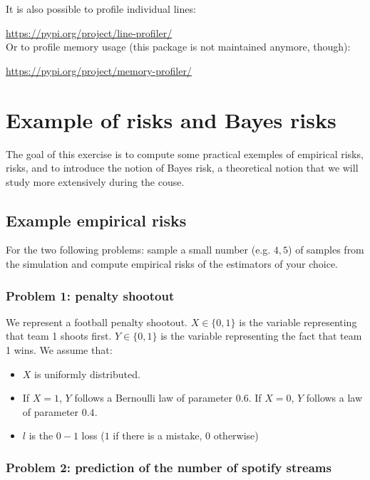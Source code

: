 \documentclass[
10pt, %
a4paper, %
oneside, %
headinclude,footinclude, %
BCOR5mm, %
]{scrartcl}
\begin{document}
It is also possible to profile individual lines:

\url{https://pypi.org/project/line-profiler/} 
\\

Or to profile memory usage (this package is not maintained anymore, though):

\url{https://pypi.org/project/memory-profiler/} 

\pagebreak

\section{\large\color{Blue}Example of risks and Bayes risks}
\label{sec:bayes}

The goal of this exercise is to compute some practical exemples of empirical risks, risks, and to introduce the notion of Bayes risk, a theoretical notion that we will study more extensively during the couse.

\subsection{Example empirical risks}%
\label{ssub:Bayes estimator}

{
    \color{Purple}For the two following problems: sample a small number (e.g. $4, 5$) of samples from the simulation and compute empirical risks of the estimators of your choice.
}

\subsubsection{Problem 1: penalty shootout}%
\label{ssub:Problem 1: penalty shootout}

We represent a football penalty shootout. $X\in\{0, 1\}$ is the variable representing that team 1 shoots first. $Y\in\{0,1\}$ is the variable representing the fact that team 1 wins. We assume that: 
\begin{itemize}
	\item $X$ is uniformly distributed.
	\item If $X=1$, $Y$ follows a Bernoulli law of parameter $0.6$. If $X=0$, $Y$ follows a law of parameter $0.4$.
	\item $l$ is the $0-1$ loss ($1$ if there is a mistake, $0$ otherwise)
\end{itemize}

\subsubsection{Problem 2: prediction of the number of spotify streams}%
\label{ssub:Problem 1}
\end{document}
